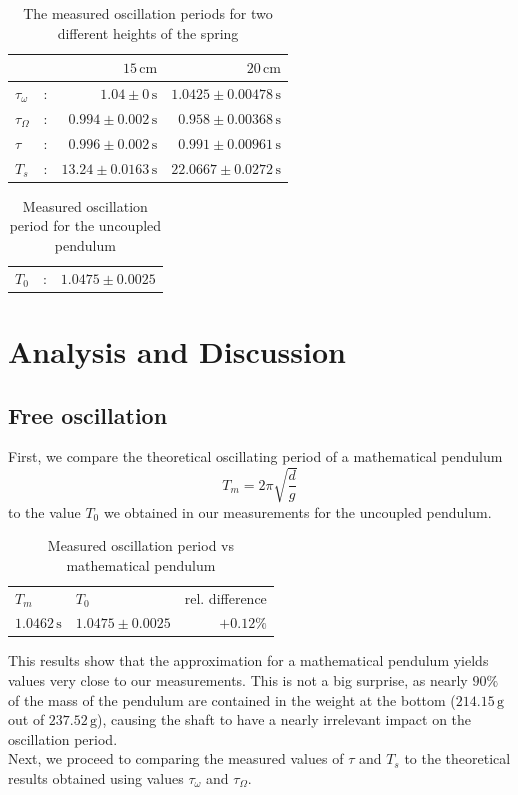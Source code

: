 \documentclass{scrreprt}
\newcommand{\unit}[1]{\ensuremath{\, \mathrm{#1}}}
\begin{document}
\begin{table}[H]
\centering
	\begin{tabular}{lcrr}
	&&$15\unit{cm}$&$20\unit{cm}$\\
	\hline	
	$\tau_\omega$&:&$1.04\pm 0 \unit{s}$&$1.0425\pm 0.00478\unit{s}$\\	
	$\tau_\Omega$&:&$0.994\pm 0.002 \unit{s}$&$0.958\pm 0.00368\unit{s}$\\
	$\tau$&:&$0.996\pm 0.002 \unit{s}$&$0.991\pm 0.00961\unit{s}$\\
	$T_s$&:&$13.24\pm 0.0163 \unit{s}$&$22.0667\pm 0.0272\unit{s}$\\
	\end{tabular}
	\caption{The measured oscillation periods for two different heights of the spring}
\end{table}
\begin{table}[H]
	\centering
	\begin{tabular}{lcr}
		$T_0$&:&$1.0475	\pm 0.0025$
	\end{tabular}
	\caption{Measured oscillation period for the uncoupled pendulum}
\end{table}

\section{Analysis and Discussion}
\subsection{Free oscillation}
First, we compare the theoretical oscillating period of a mathematical pendulum 
\begin{equation}
	T_m=2\pi\sqrt{\frac{d}{g}}
\end{equation}
to the value $T_0$ we obtained in our measurements for the uncoupled pendulum.
\begin{table}[H]
	\centering
	\begin{tabular}{llr}
		$T_m$&$T_0$&rel. difference\\
		$1.0462 \unit{s}$&$1.0475 \pm 0.0025$ & $+0.12\%$
	\end{tabular}
	\caption{Measured oscillation period vs mathematical pendulum}
\end{table}
This results show that the approximation for a mathematical pendulum yields values very close to our measurements. This is not a big surprise, as nearly $90\%$ of the mass of the pendulum are contained in the weight at the bottom ($214.15\unit{g}$ out of $237.52\unit{g}$), causing the shaft to have a nearly irrelevant impact on the oscillation period.\\
\newline
Next, we proceed to comparing the measured values of $\tau$ and $T_s$ to the theoretical results obtained using values $\tau_\omega$ and $\tau_\Omega$.
\end{document}
